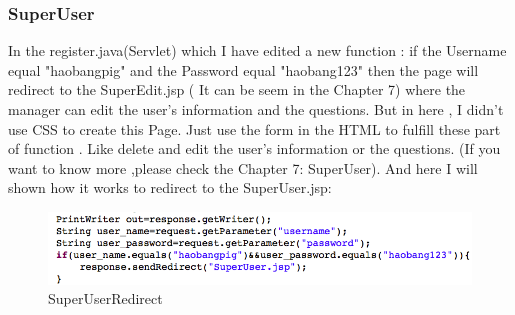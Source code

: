 \documentclass[12pt]{article}
\begin{document}
\subsubsection{SuperUser}
In the register.java(Servlet) which I have edited a new function : if the Username equal "haobangpig" and the Password equal "haobang123"  then the page will redirect to the SuperEdit.jsp ( It can be seem in the Chapter 7)  where the manager can  edit the user's information and the questions.  But in here , I didn't use CSS to create this Page. Just use the form in the HTML to fulfill these part of function . Like delete and edit the user's information or the questions. (If you want to know more ,please check the Chapter 7: SuperUser). And here I will shown how it works to redirect to the SuperUser.jsp:
\begin{figure}[H]
	\centering
		\includegraphics[width=15cm]{images/SuperUserRedirect.jpg}

		\caption[SuperUserRedirect]{SuperUserRedirect}
	\label{fig:SuperUserRedirect}
\end{figure}


\newpage
			
\end{document}
